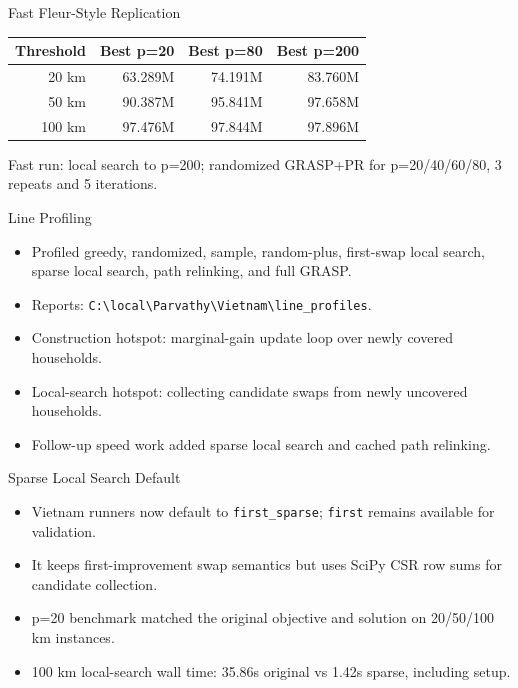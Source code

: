 \documentclass[10pt,aspectratio=169]{beamer}
\newcommand{\code}[1]{\texttt{#1}}
\begin{document}
\begin{frame}{Fast Fleur-Style Replication}
  \small
  \begin{tabular}{r r r r}
    \toprule
    Threshold & Best p=20 & Best p=80 & Best p=200 \\
    \midrule
    20 km & 63.289M & 74.191M & 83.760M \\
    50 km & 90.387M & 95.841M & 97.658M \\
    100 km & 97.476M & 97.844M & 97.896M \\
    \bottomrule
  \end{tabular}
  \vspace{0.35cm}

  Fast run: local search to p=200; randomized GRASP+PR for p=20/40/60/80, 3 repeats and 5 iterations.
\end{frame}

\begin{frame}{Line Profiling}
  \small
  \begin{itemize}
    \item Profiled greedy, randomized, sample, random-plus, first-swap local search, sparse local search, path relinking, and full GRASP.
    \item Reports: \code{C:\textbackslash local\textbackslash Parvathy\textbackslash Vietnam\textbackslash line\_profiles}.
    \item Construction hotspot: marginal-gain update loop over newly covered households.
    \item Local-search hotspot: collecting candidate swaps from newly uncovered households.
    \item Follow-up speed work added sparse local search and cached path relinking.
  \end{itemize}
\end{frame}

\begin{frame}{Sparse Local Search Default}
  \small
  \begin{itemize}
    \item Vietnam runners now default to \code{first\_sparse}; \code{first} remains available for validation.
    \item It keeps first-improvement swap semantics but uses SciPy CSR row sums for candidate collection.
    \item p=20 benchmark matched the original objective and solution on 20/50/100 km instances.
    \item 100 km local-search wall time: 35.86s original vs 1.42s sparse, including setup.
  \end{itemize}
\end{frame}
\end{document}
